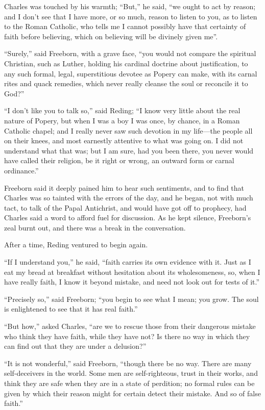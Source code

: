 Charles was touched by his warmth; ``But,'' he said,
``we ought to act by reason; and I don't see that I have more, or
so much, reason to listen to you, as to listen to the Roman Catholic,
who tells me I cannot possibly have that certainty of faith before
believing, which on believing will be divinely given me''.

``Surely,'' said Freeborn, with a grave face, ``you
would not compare the spiritual Christian, such as Luther, holding his
cardinal doctrine about justification, to any such formal,
legal, superstitious devotee as Popery can make, with its carnal rites
and quack remedies, which never really cleanse the soul or reconcile
it to God?''

``I don't like you to talk so,'' said Reding; ``I know very
little about the real nature of Popery, but when I was a boy I was
once, by chance, in a Roman Catholic chapel; and I really never saw
such devotion in my life—the people all on their knees, and most
earnestly attentive to what was going on. I did not understand what
that was; but I am sure, had you been there, you never would have
called their religion, be it right or wrong, an outward form or carnal
ordinance.''

Freeborn said it deeply pained him to hear such sentiments, and to
find that Charles was so tainted with the errors of the day, and he
began, not with much tact, to talk of the Papal Antichrist, and would
have got off to prophecy, had Charles said a word to afford fuel for
discussion. As he kept silence, Freeborn's zeal burnt out, and there
was a break in the conversation.

After a time, Reding ventured to begin again.

``If I understand you,'' he said, ``faith carries its
own evidence with it. Just as I eat my bread at breakfast without
hesitation about its wholesomeness, so, when I have really faith, I
know it beyond mistake, and need not look out for tests of it.''

``Precisely so,'' said Freeborn; ``you begin to see
what I mean; you grow. The soul is enlightened to see that it has real
faith.''

``But how,'' asked Charles, ``are we to rescue those
from their dangerous mistake who think they have faith, while
they have not? Is there no way in which they can find out that they
are under a delusion?''

``It is not wonderful,'' said Freeborn, ``though there
be no way. There are many self-deceivers in the world. Some men are
self-righteous, trust in their works, and think they are safe when
they are in a state of perdition; no formal rules can be given by
which their reason might for certain detect their mistake. And so of
false faith.''

